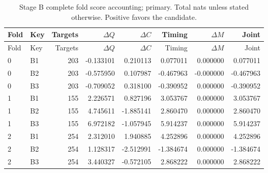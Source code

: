 {\small
\setlength{\tabcolsep}{3pt}
\begin{longtable}{llrrrrrr}
\caption{Stage B complete fold score accounting; primary. Total nats unless stated otherwise. Positive favors the candidate.}\label{tab:B-primary}\\
\toprule
Fold & Key & Targets & $\Delta Q$ & $\Delta C$ & Timing & $\Delta M$ & Joint\\\midrule
\endfirsthead
\toprule
Fold & Key & Targets & $\Delta Q$ & $\Delta C$ & Timing & $\Delta M$ & Joint\\\midrule
\endhead
0 & B1 & 203 & -0.133101 & 0.210113 & 0.077011 & 0.000000 & 0.077011\\
0 & B2 & 203 & -0.575950 & 0.107987 & -0.467963 & -0.000000 & -0.467963\\
0 & B3 & 203 & -0.709052 & 0.318100 & -0.390952 & 0.000000 & -0.390952\\
1 & B1 & 155 & 2.226571 & 0.827196 & 3.053767 & 0.000000 & 3.053767\\
1 & B2 & 155 & 4.745611 & -1.885141 & 2.860470 & 0.000000 & 2.860470\\
1 & B3 & 155 & 6.972182 & -1.057945 & 5.914237 & 0.000000 & 5.914237\\
2 & B1 & 254 & 2.312010 & 1.940885 & 4.252896 & 0.000000 & 4.252896\\
2 & B2 & 254 & 1.128317 & -2.512991 & -1.384674 & 0.000000 & -1.384674\\
2 & B3 & 254 & 3.440327 & -0.572105 & 2.868222 & 0.000000 & 2.868222\\
\bottomrule
\end{longtable}
}

